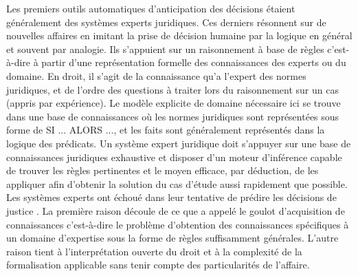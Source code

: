 Les premiers outils automatiques d'anticipation des décisions étaient généralement des systèmes experts juridiques. Ces derniers résonnent  sur de nouvelles affaires en imitant la prise de décision humaine par la logique en général et souvent par analogie. Ils s'appuient sur un raisonnement à base de règles c'est-à-dire à partir d'une représentation formelle des connaissances des experts ou du domaine. En droit, il s'agit de la connaissance qu'a l'expert des normes juridiques, et de l'ordre des questions à traiter lors du raisonnement sur un cas (appris par expérience). Le modèle explicite de domaine nécessaire ici se trouve dans une base de connaissances où les normes juridiques sont représentées sous forme de \og SI ... ALORS ...\fg{}, et les faits sont généralement représentés dans la logique des prédicats. Un système expert juridique doit s’appuyer sur une base de connaissances juridiques exhaustive et disposer d’un moteur d’inférence capable de trouver les règles pertinentes et le moyen efficace, par déduction, de les appliquer afin d’obtenir la solution du cas d'étude aussi rapidement que possible. Les systèmes experts ont échoué dans leur tentative de prédire les décisions de justice \citep{leith2010risefall}. La première raison découle de ce que \citet{Berka2011rbr-cbr} a appelé le \og goulot d'acquisition de connaissances \fg{} c'est-à-dire le problème d'obtention des connaissances spécifiques à un domaine d’expertise sous la forme de règles suffisamment générales. L'autre raison tient à l'interprétation ouverte du droit et à la complexité de la formalisation applicable sans tenir compte des particularités de l'affaire.

